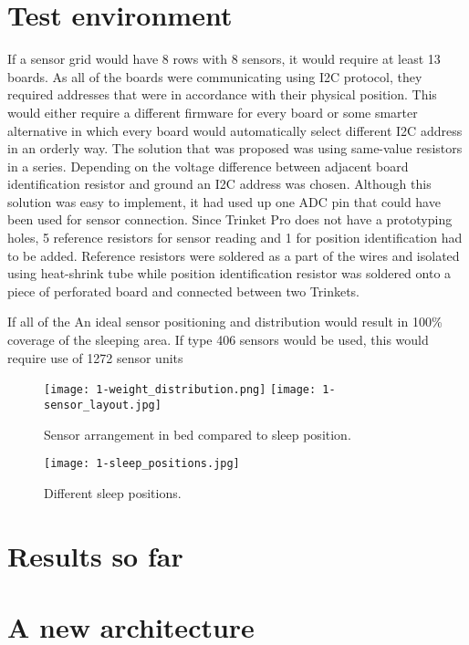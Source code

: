\section{Test environment}
\label{ssec:test_environment}

If a sensor grid would have 8 rows with 8 sensors, it would require at least 13 boards. As all of the boards were communicating using \ac{I2C} protocol, they required addresses that were in accordance with their physical position. This would either require a different firmware for every board or some smarter alternative in which every board would automatically select different I2C address in an orderly way. The solution that was proposed was using same-value resistors in a series. Depending on the voltage difference between adjacent board identification resistor and ground an \ac{I2C} address was chosen. Although this solution was easy to implement, it had used up one ADC pin that could have been used for sensor connection. Since Trinket Pro does not have a prototyping holes, 5 reference resistors for sensor reading and 1 for position identification had to be added. Reference resistors were soldered as a part of the wires and isolated using heat-shrink tube while position identification resistor was soldered onto a piece of perforated board and connected between two Trinkets.

If all of the 
An ideal sensor positioning and distribution would result in 100\% coverage of the sleeping area. If type 406 sensors would be used, this would require use of 1272 sensor units

\begin{figure}[h]
  \begin{center}
    \texttt{[image: 1-weight\_distribution.png]}
    \texttt{[image: 1-sensor\_layout.jpg]}
  \end{center}
  \caption{Sensor arrangement in bed compared to sleep position.}
  \label{fig:sensor-layout}
\end{figure}

\begin{figure}[h]
  \begin{center}
    \texttt{[image: 1-sleep\_positions.jpg]}
  \end{center}
  \caption{Different sleep positions.}
  \label{fig:sleep_positions}
\end{figure}


\section{Results so far}

\section{A new architecture}

